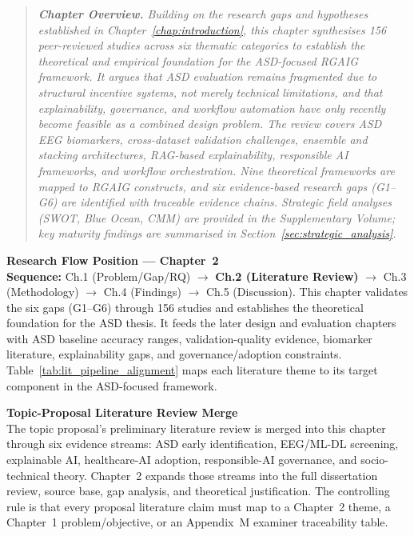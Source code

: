 \vspace{0.3em}
\noindent\begin{quote}\itshape\small
\textbf{\color{currentaccent}Chapter Overview.}
Building on the research gaps and hypotheses established in Chapter~\ref{chap:introduction}, this chapter synthesises 156 peer-reviewed studies across six thematic categories to establish the theoretical and empirical foundation for the ASD-focused RGAIG framework.
It argues that ASD evaluation remains fragmented due to structural incentive systems, not merely technical limitations, and that explainability, governance, and workflow automation have only recently become feasible as a combined design problem.
The review covers ASD EEG biomarkers, cross-dataset validation challenges, ensemble and stacking architectures, RAG-based explainability, responsible AI frameworks, and workflow orchestration.
Nine theoretical frameworks are mapped to RGAIG constructs, and six evidence-based research gaps (G1--G6) are identified with traceable evidence chains.
Strategic field analyses (SWOT, Blue Ocean, CMM) are provided in the Supplementary Volume; key maturity findings are summarised in Section~\ref{sec:strategic_analysis}.
\end{quote}
\vspace{0.3em}

\medskip\noindent
\small\textbf{Research Flow Position --- Chapter~2}\\[3pt]
\textbf{Sequence:} Ch.1 (Problem/Gap/RQ) $\to$ \textbf{Ch.2 (Literature Review)} $\to$ Ch.3 (Methodology) $\to$ Ch.4 (Findings) $\to$ Ch.5 (Discussion).
This chapter validates the six gaps (G1--G6) through 156 studies and establishes the theoretical foundation for the ASD thesis. It feeds the later design and evaluation chapters with ASD baseline accuracy ranges, validation-quality evidence, biomarker literature, explainability gaps, and governance/adoption constraints. Table~\ref{tab:lit_pipeline_alignment} maps each literature theme to its target component in the ASD-focused framework.

\medskip\noindent
\small\textbf{Topic-Proposal Literature Review Merge}\\[3pt]
The topic proposal's preliminary literature review is merged into this chapter through six evidence streams: ASD early identification, EEG/ML-DL screening, explainable AI, healthcare-AI adoption, responsible-AI governance, and socio-technical theory. Chapter~2 expands those streams into the full dissertation review, source base, gap analysis, and theoretical justification. The controlling rule is that every proposal literature claim must map to a Chapter~2 theme, a Chapter~1 problem/objective, or an Appendix~M examiner traceability table.

